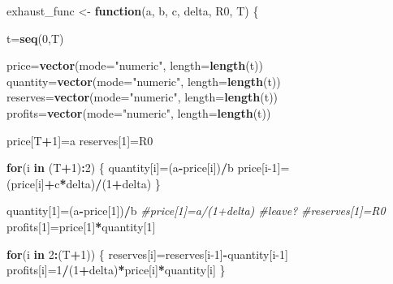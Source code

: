 \documentclass[
]{article}
\newenvironment{Shaded}{\begin{snugshade}}{\end{snugshade}}
\newcommand{\AttributeTok}[1]{\textcolor[rgb]{0.13,0.29,0.53}{#1}}
\newcommand{\CommentTok}[1]{\textcolor[rgb]{0.56,0.35,0.01}{\textit{#1}}}
\newcommand{\ControlFlowTok}[1]{\textcolor[rgb]{0.13,0.29,0.53}{\textbf{#1}}}
\newcommand{\DecValTok}[1]{\textcolor[rgb]{0.00,0.00,0.81}{#1}}
\newcommand{\FunctionTok}[1]{\textcolor[rgb]{0.13,0.29,0.53}{\textbf{#1}}}
\newcommand{\NormalTok}[1]{#1}
\newcommand{\OtherTok}[1]{\textcolor[rgb]{0.56,0.35,0.01}{#1}}
\newcommand{\SpecialCharTok}[1]{\textcolor[rgb]{0.81,0.36,0.00}{\textbf{#1}}}
\newcommand{\StringTok}[1]{\textcolor[rgb]{0.31,0.60,0.02}{#1}}
\begin{document}
\begin{Shaded}
\begin{Highlighting}[]
\NormalTok{exhaust\_func }\OtherTok{\textless{}{-}} \ControlFlowTok{function}\NormalTok{(a, b, c, delta, R0, T) \{}
  
\NormalTok{  t}\OtherTok{=}\FunctionTok{seq}\NormalTok{(}\DecValTok{0}\NormalTok{,T)}
  
\NormalTok{  price}\OtherTok{=}\FunctionTok{vector}\NormalTok{(}\AttributeTok{mode=}\StringTok{"numeric"}\NormalTok{, }\AttributeTok{length=}\FunctionTok{length}\NormalTok{(t))}
\NormalTok{  quantity}\OtherTok{=}\FunctionTok{vector}\NormalTok{(}\AttributeTok{mode=}\StringTok{"numeric"}\NormalTok{, }\AttributeTok{length=}\FunctionTok{length}\NormalTok{(t))}
\NormalTok{  reserves}\OtherTok{=}\FunctionTok{vector}\NormalTok{(}\AttributeTok{mode=}\StringTok{"numeric"}\NormalTok{, }\AttributeTok{length=}\FunctionTok{length}\NormalTok{(t))}
\NormalTok{  profits}\OtherTok{=}\FunctionTok{vector}\NormalTok{(}\AttributeTok{mode=}\StringTok{"numeric"}\NormalTok{, }\AttributeTok{length=}\FunctionTok{length}\NormalTok{(t))}
  
\NormalTok{  price[T}\SpecialCharTok{+}\DecValTok{1}\NormalTok{]}\OtherTok{=}\NormalTok{a}
\NormalTok{  reserves[}\DecValTok{1}\NormalTok{]}\OtherTok{=}\NormalTok{R0}
  
  \ControlFlowTok{for}\NormalTok{(i }\ControlFlowTok{in}\NormalTok{ (T}\SpecialCharTok{+}\DecValTok{1}\NormalTok{)}\SpecialCharTok{:}\DecValTok{2}\NormalTok{) \{}
\NormalTok{    quantity[i]}\OtherTok{=}\NormalTok{(a}\SpecialCharTok{{-}}\NormalTok{price[i])}\SpecialCharTok{/}\NormalTok{b}
\NormalTok{    price[i}\DecValTok{{-}1}\NormalTok{]}\OtherTok{=}\NormalTok{(price[i]}\SpecialCharTok{+}\NormalTok{c}\SpecialCharTok{*}\NormalTok{delta)}\SpecialCharTok{/}\NormalTok{(}\DecValTok{1}\SpecialCharTok{+}\NormalTok{delta)}
\NormalTok{  \}}
  
\NormalTok{  quantity[}\DecValTok{1}\NormalTok{]}\OtherTok{=}\NormalTok{(a}\SpecialCharTok{{-}}\NormalTok{price[}\DecValTok{1}\NormalTok{])}\SpecialCharTok{/}\NormalTok{b}
  \CommentTok{\#price[1]=a/(1+delta) \#leave?}
  \CommentTok{\#reserves[1]=R0}
\NormalTok{  profits[}\DecValTok{1}\NormalTok{]}\OtherTok{=}\NormalTok{price[}\DecValTok{1}\NormalTok{]}\SpecialCharTok{*}\NormalTok{quantity[}\DecValTok{1}\NormalTok{]}
  
  \ControlFlowTok{for}\NormalTok{(i }\ControlFlowTok{in} \DecValTok{2}\SpecialCharTok{:}\NormalTok{(T}\SpecialCharTok{+}\DecValTok{1}\NormalTok{)) \{}
\NormalTok{    reserves[i]}\OtherTok{=}\NormalTok{reserves[i}\DecValTok{{-}1}\NormalTok{]}\SpecialCharTok{{-}}\NormalTok{quantity[i}\DecValTok{{-}1}\NormalTok{]}
\NormalTok{    profits[i]}\OtherTok{=}\DecValTok{1}\SpecialCharTok{/}\NormalTok{(}\DecValTok{1}\SpecialCharTok{+}\NormalTok{delta)}\SpecialCharTok{*}\NormalTok{price[i]}\SpecialCharTok{*}\NormalTok{quantity[i]}
\NormalTok{  \}}
  

\end{Highlighting}
\end{Shaded}
\end{document}
